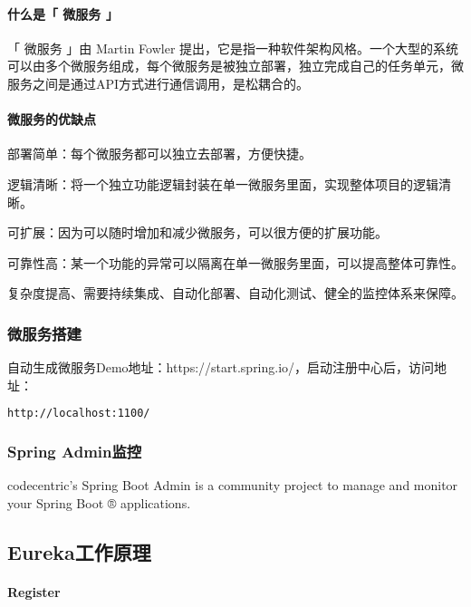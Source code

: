 \documentclass[../../../interview-questions.tex]{subfiles}
\begin{document}
\paragraph{什么是「 微服务 」}

「 微服务 」由 Martin Fowler 提出，它是指一种软件架构风格。一个大型的系统可以由多个微服务组成，每个微服务是被独立部署，独立完成自己的任务单元，微服务之间是通过API方式进行通信调用，是松耦合的。

\paragraph{微服务的优缺点}

部署简单：每个微服务都可以独立去部署，方便快捷。

逻辑清晰：将一个独立功能逻辑封装在单一微服务里面，实现整体项目的逻辑清晰。

可扩展：因为可以随时增加和减少微服务，可以很方便的扩展功能。

可靠性高：某一个功能的异常可以隔离在单一微服务里面，可以提高整体可靠性。


复杂度提高、需要持续集成、自动化部署、自动化测试、健全的监控体系来保障。

\subsubsection{微服务搭建}

自动生成微服务Demo地址：https://start.spring.io/，启动注册中心后，访问地址：

\begin{lstlisting}[language=HTML]
http://localhost:1100/
\end{lstlisting}

\subsubsection{Spring Admin监控}

codecentric’s Spring Boot Admin is a community project to manage and monitor your Spring Boot ® applications. 


\subsection{Eureka工作原理}

\paragraph{Register}
\end{document}
